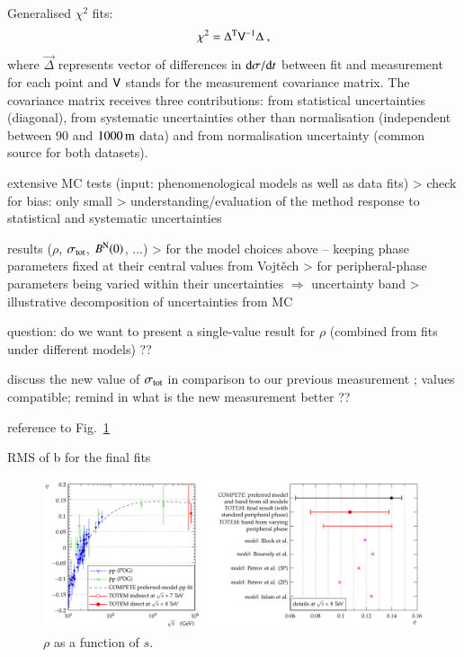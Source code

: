 Generalised $\chi^2$ fits:
\begin{equation}
\label{eq:chi sq}
	\chi^2 = \Delta^{\rm T} \mathsf{V}^{-1} \Delta\ ,
\end{equation}
where $\vec\Delta$ represents vector of differences in ${\rm d}\sigma/{\rm d} t$ between fit and measurement for each point and $\mathsf{V}$ stands for the measurement covariance matrix. The covariance matrix receives three contributions: from statistical uncertainties (diagonal), from systematic uncertainties other than normalisation (independent between $90$ and $1000\,{\rm m}$ data) and from normalisation uncertainty (common source for both datasets).

\> extensive MC tests (input: phenomenological models as well as data fits)
\>> check for bias: only small
\>> understanding/evaluation of the method response to statistical and systematic uncertainties

\> results ($\rho$, $\sigma_{\rm tot}$, $B^{\rm N}(0)$, ...)
\>> for the model choices above -- keeping phase parameters fixed at their central values from Vojt\v ech
\>> for peripheral-phase parameters being varied within their uncertainties $\Rightarrow$ uncertainty band
\>> illustrative decomposition of uncertainties from MC

\> question: do we want to present a single-value result for $\rho$ (combined from fits under different models) ??

\> discuss the new value of $\sigma_{\rm tot}$ in comparison to our previous measurement \cite{prl111}; values compatible; remind in what is the new measurement better ??

\> reference to Fig.~\ref{fig:rho_s}

\> RMS of b for the final fits

\iffalse
\begin{figure}
\begin{center}
\includegraphics[width=16cm]{fig/rho_s.pdf}
\vskip-3mm
\caption{$\rho$ as a function of $s$.}
\label{fig:rho_s}
\end{center}
\end{figure}

